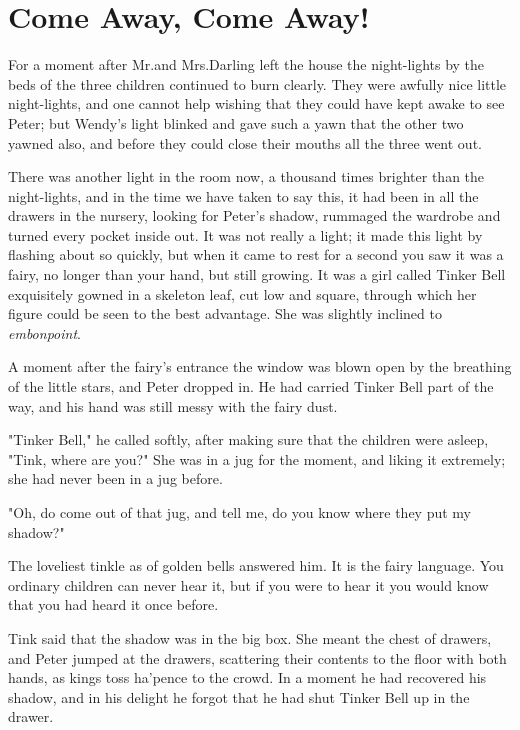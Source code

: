 
\chapter{Come Away, Come Away!}

For a moment after Mr.\@ and Mrs.\@ Darling left the house
the night-lights by the beds of the three children continued to burn clearly.
They were awfully nice little night-lights,
and one cannot help wishing that they could have kept awake to see Peter;
but Wendy's light blinked and gave such a yawn that the other two yawned also,
and before they could close their mouths all the three went out.

There was another light in the room now, a thousand times brighter than the night-lights,
and in the time we have taken to say this, it had been in all the drawers in the nursery,
looking for Peter's shadow, rummaged the wardrobe and turned every pocket inside out.
It was not really a light;
it made this light by flashing about so quickly,
but when it came to rest for a second you saw it was a fairy, no longer than your hand, but still growing.
It was a girl called Tinker Bell exquisitely gowned in a skeleton leaf, cut low and square,
through which her figure could be seen to the best advantage.
She was slightly inclined to \emph{embonpoint}.

A moment after the fairy's entrance the window was blown open by the breathing of the little stars,
and Peter dropped in.
He had carried Tinker Bell part of the way, and his hand was still messy with the fairy dust.

"Tinker Bell," he called softly, after making sure that the children were asleep,
"Tink, where are you?"
She was in a jug for the moment, and liking it extremely;
she had never been in a jug before.

"Oh, do come out of that jug, and tell me, do you know where they put my shadow?"

The loveliest tinkle as of golden bells answered him.
It is the fairy language.
You ordinary children can never hear it,
but if you were to hear it you would know that you had heard it once before.

Tink said that the shadow was in the big box.
She meant the chest of drawers, and Peter jumped at the drawers,
scattering their contents to the floor with both hands, as kings toss ha'pence to the crowd.
In a moment he had recovered his shadow,
and in his delight he forgot that he had shut Tinker Bell up in the drawer.

